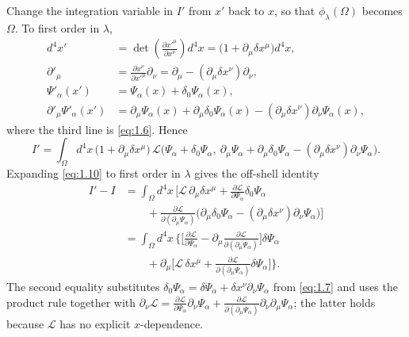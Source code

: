 \documentclass[11pt,a4paper]{article}
\begin{document}
Change the integration variable in $I'$ from $x'$ back to $x$, so that $\phi_\lambda(\Omega)$ becomes $\Omega$. To first order in $\lambda$,
\begin{equation*}
\begin{aligned}
d^4x'
&=\det\!\left(\frac{\partial x'^\mu}{\partial x^\nu}\right)d^4x
=\bigl(1+\partial_\mu\delta x^\mu\bigr)d^4x,\\
\partial'_\mu
&=\frac{\partial x^\nu}{\partial x'^\mu}\partial_\nu
=\partial_\mu-(\partial_\mu\delta x^\nu)\partial_\nu,\\
\Psi'_\alpha(x')
&=\Psi_\alpha(x)+\delta_0\Psi_\alpha(x),\\
\partial'_\mu\Psi'_\alpha(x')
&=\partial_\mu\Psi_\alpha(x)
+\partial_\mu\delta_0\Psi_\alpha(x)
-(\partial_\mu\delta x^\nu)\partial_\nu\Psi_\alpha(x),
\end{aligned}
\tag{1.9}\label{eq:1.9}
\end{equation*}
where the third line is \eqref{eq:1.6}. Hence
\begin{equation*}
I'=\int_\Omega d^4x\,
\bigl(1+\partial_\mu\delta x^\mu\bigr)\,
\mathcal L\bigl(
\Psi_\alpha+\delta_0\Psi_\alpha,\
\partial_\mu\Psi_\alpha
+\partial_\mu\delta_0\Psi_\alpha
-(\partial_\mu\delta x^\nu)\partial_\nu\Psi_\alpha
\bigr).
\tag{1.10}\label{eq:1.10}
\end{equation*}
Expanding \eqref{eq:1.10} to first order in $\lambda$ gives the off-shell identity
\begin{equation*}
\begin{aligned}
I'-I
&=\int_\Omega d^4x\,\biggl[
\mathcal L\,\partial_\mu\delta x^\mu
+\frac{\partial\mathcal L}{\partial\Psi_\alpha}\delta_0\Psi_\alpha\\
&\qquad
+\frac{\partial\mathcal L}{\partial(\partial_\mu\Psi_\alpha)}
\bigl(\partial_\mu\delta_0\Psi_\alpha-(\partial_\mu\delta x^\nu)\partial_\nu\Psi_\alpha\bigr)
\biggr]\\
&=\int_\Omega d^4x\,\biggl\{
\biggl[
\frac{\partial\mathcal L}{\partial\Psi_\alpha}
-\partial_\mu\frac{\partial\mathcal L}{\partial(\partial_\mu\Psi_\alpha)}
\biggr]\delta\Psi_\alpha\\
&\qquad
+\partial_\mu\biggl[
\mathcal L\,\delta x^\mu
+\frac{\partial\mathcal L}{\partial(\partial_\mu\Psi_\alpha)}\delta\Psi_\alpha
\biggr]
\biggr\}.
\end{aligned}
\tag{1.11}\label{eq:1.11}
\end{equation*}
The second equality substitutes $\delta_0\Psi_\alpha=\delta\Psi_\alpha+\delta x^\nu\partial_\nu\Psi_\alpha$ from \eqref{eq:1.7} and uses the product rule together with $\partial_\nu\mathcal L=\frac{\partial\mathcal L}{\partial\Psi_\alpha}\partial_\nu\Psi_\alpha+\frac{\partial\mathcal L}{\partial(\partial_\mu\Psi_\alpha)}\partial_\nu\partial_\mu\Psi_\alpha$; the latter holds because $\mathcal L$ has no explicit $x$-dependence.
\end{document}
